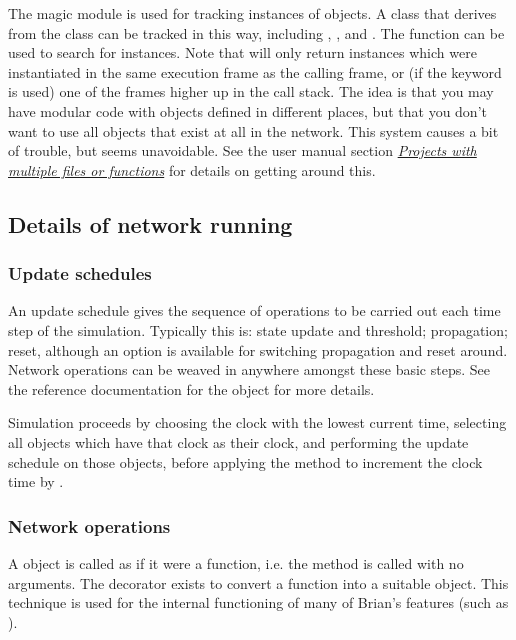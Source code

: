 \documentclass[letterpaper,10pt,english]{manual}
\begin{document}
The magic module is used for tracking instances of objects. A class that derives
from the  class can be tracked in this way,
including , , 
and . The  function can be used to search
for instances. Note that  will only return instances which
were instantiated in the same execution frame as the 
calling frame, or (if the  keyword is used) one of the frames higher up
in the call stack. The idea is that you may have modular code with objects
defined in different places, but that you don't want to use all objects that
exist at all in the network. This system causes a bit of trouble, but seems
unavoidable. See the user manual section
\hyperlink{projects-with-multiple-files}{\emph{Projects with multiple files or functions}} for details on getting around this.


\subsection{Details of network running}


\subsubsection{Update schedules}

An update schedule gives the sequence of operations to be carried out each time
step of the simulation. Typically this is: state update and threshold;
propagation; reset, although an option is available for switching propagation
and reset around. Network operations can be weaved in anywhere amongst these
basic steps. See the reference documentation for the  object
for more details.

Simulation proceeds by choosing the clock with the lowest current time,
selecting all objects which have that clock as their clock, and performing the
update schedule on those objects, before applying the  method
to increment the clock time by .


\subsubsection{Network operations}

A  object is called as if it were a function, i.e. the
 method is called with no arguments. The 
decorator exists to convert a function into a suitable 
object. This technique is used for the internal functioning of many of Brian's
features (such as ).
\end{document}
